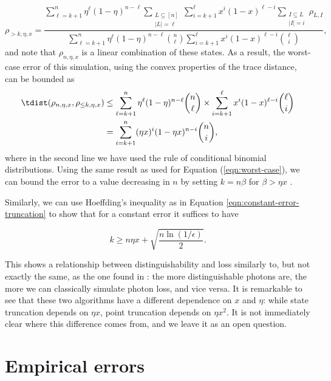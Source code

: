 \begin{equation}
\rho_{>k,\eta,x} = \frac{\sum_{\ell=k+1}^n\eta^\ell(1-\eta)^{n-\ell}\sum_{\substack{L\subseteq[n]\\|L|=\ell}}\sum_{i=k+1}^\ell x^i(1-x)^{\ell-i}\sum_{\substack{I\subseteq L\\|I|=i}}\rho_{L,I}}{\sum_{\ell=k+1}^n\eta^\ell(1-\eta)^{n-\ell}\binom{n}{\ell}\sum_{i=k+1}^\ell x^i(1-x)^{\ell-i}\binom{\ell}{i}},
\end{equation}
and note that $\rho_{n,\eta,x}$ is a linear combination of these states. 
As a result, the worst-case error of this simulation, using the convex properties of the trace distance, can be bounded as
\begin{align}
\tdist(\rho_{n,\eta,x},\rho_{\leq k,\eta,x}) &\leq \sum_{\ell=k+1}^n\eta^\ell(1-\eta)^{n-\ell}\binom{n}{\ell}\times\sum_{i=k+1}^\ell x^i(1-x)^{\ell-i}\binom{\ell}{i}\\
&=\sum_{i=k+1}^n(\eta x)^i(1-\eta x)^{n-i}\binom{n}{i}\label{eqn:lossy-worst},
\end{align}
where in the second line we have used the rule of conditional binomial distributions. 
Using the same result as used for Equation (\ref{eqn:worst-case}), we can bound the error to a value decreasing in $n$ by setting $k = n\beta$ for $\beta>\eta x$ \cite{arratia1989}. 

Similarly, we can use Hoeffding's inequality as in Equation \ref{eqn:constant-error-truncation} to show that for a constant error it suffices to have

\begin{equation}
k \geq n\eta x + \sqrt{\frac{n\ln(1/\epsilon)}{2}}.
\end{equation}

This shows a relationship between distinguishability and loss similarly to, but not exactly the same, as the one found in \cite{renema2018loss}: the more distinguishable photons are, the more we can classically simulate photon loss, and vice versa. It is remarkable to see that these two algorithms have a different dependence on $x$ and $\eta$: while state truncation depends on $\eta x$, point truncation depends on $\eta x^2$. It is not immediately clear where this difference comes from, and we leave it as an open question.



\section{Empirical errors}
\label{sec:empirical-errors}

